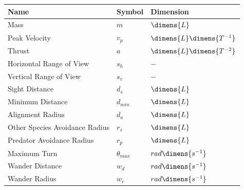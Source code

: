 \documentclass{beamer}
\begin{document}
\begin{frame}
	\begin{table}[h!]
		\centering
		\begin{tabular}{ |l | l |l| }
			\hline
			\textbf{Name}& \textbf{Symbol} & \textbf{Dimension}\\ \hline
			
			Mass & \(m\) & \(\dimens{L}\) \\
			Peak Velocity & \(v_p\)  & \( \dimens{L} \dimens{T^{-1}}\)  \\
			Thrust 	& \(a\) & \( \dimens{L} \dimens{T^{-2}}\)  \\
			Horizontal Range of View & \(s_h\) & \(-\) \\ 
			Vertical Range of View & \(s_v\) 	& \(-\) \\
			Sight Distance & \(d_s\) & \( \dimens{L}\) \\
			Minimum Distance & \(d_{min}\) & \( \dimens{L}\)\\
			Alignment Radius & \(d_a\) & \( \dimens{L}\)  \\
			Other Species Avoidance Radius & \(r_s\) & \( \dimens{L}\)\\
			Predator Avoidance Radius & \(r_p\) & \( \dimens{L}\) \\
			Maximum Turn & \(\theta_{max}\) & \( rad \dimens{s^{-1}} \)\\
			Wander Distance & \(w_d\) & \( rad \dimens{s^{-1}} \) \\
			Wander Radius & \(w_r\)	& \( rad \dimens{s^{-1}} \) \\ 
			\hline
		\end{tabular}
	\end{table}
\end{frame}
\end{document}
